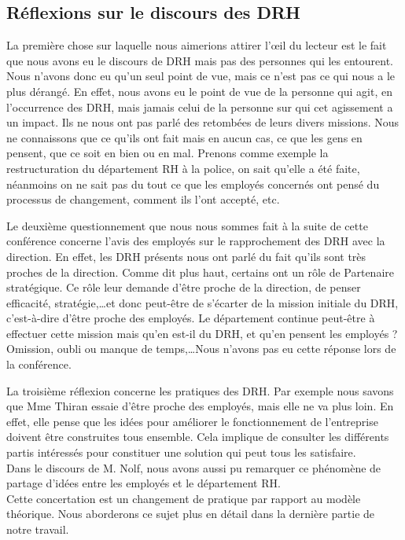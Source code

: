 \subsection{Réflexions sur le discours des DRH}

La première chose sur laquelle nous aimerions attirer l'œil du lecteur est le fait que nous avons eu le discours de DRH mais pas des personnes qui les entourent. Nous n'avons donc eu qu'un seul point de vue, mais ce n'est pas ce qui nous a le plus dérangé. En effet, nous avons eu le point de vue de la personne qui agit, en l'occurrence des DRH, mais jamais celui de la personne sur qui cet agissement a un impact. Ils ne nous ont pas parlé des retombées de leurs divers missions. Nous ne connaissons que ce qu'ils ont fait mais en aucun cas, ce que les gens en pensent, que ce soit en bien ou en mal. Prenons comme exemple la restructuration du département RH à la police, on sait qu'elle a été faite, néanmoins on ne sait pas du tout ce que les employés concernés ont pensé du processus de changement, comment ils l'ont accepté, etc. \newline 

Le deuxième questionnement que nous nous sommes fait à la suite de cette conférence concerne l'avis des employés sur le rapprochement des DRH avec la direction. En effet, les DRH présents nous ont parlé du fait qu'ils sont très proches de la direction. Comme dit plus haut, certains ont un rôle de \og{}Partenaire stratégique\fg{}. Ce rôle leur demande d'être proche de la direction, de penser efficacité, stratégie,\ldots et donc peut-être de s'écarter de la mission initiale du DRH, c'est-à-dire d'être proche des employés.
 Le département continue peut-être à effectuer cette mission mais qu'en est-il du DRH, et qu'en pensent les employés ? Omission, oubli ou manque de temps,\ldots Nous n'avons pas eu cette réponse lors de la conférence. \newline

La troisième réflexion concerne les pratiques des DRH. Par exemple nous savons que Mme Thiran essaie d'être proche des employés, mais elle ne va plus loin. En effet, elle pense que les idées pour améliorer le fonctionnement de l'entreprise doivent être construites tous ensemble. Cela implique de consulter les différents partis intéressés pour constituer une solution qui peut tous les satisfaire. \\
Dans le discours de M. Nolf, nous avons aussi pu remarquer ce phénomène de partage d'idées entre les employés et le département RH.\\
Cette concertation est un changement de pratique par rapport au modèle théorique. Nous aborderons ce sujet plus en détail dans la dernière partie de notre travail.\newline

